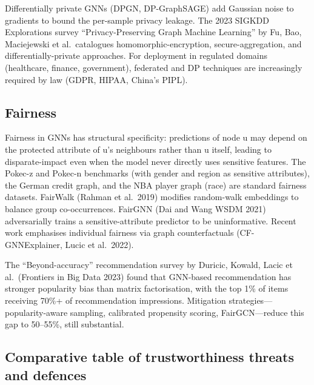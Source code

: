 \documentclass{article}
\begin{document}
Differentially private GNNs (DPGN, DP-GraphSAGE) add Gaussian noise to gradients to bound the per-sample privacy leakage. The 2023 SIGKDD Explorations survey ``Privacy-Preserving Graph Machine Learning'' by Fu, Bao, Maciejewski et al.~catalogues homomorphic-encryption, secure-aggregation, and differentially-private approaches. For deployment in regulated domains (healthcare, finance, government), federated and DP techniques are increasingly required by law (GDPR, HIPAA, China's PIPL).

\subsection{Fairness}\label{fairness}

Fairness in GNNs has structural specificity: predictions of node u may depend on the protected attribute of u's neighbours rather than u itself, leading to disparate-impact even when the model never directly uses sensitive features. The Pokec-z and Pokec-n benchmarks (with gender and region as sensitive attributes), the German credit graph, and the NBA player graph (race) are standard fairness datasets. FairWalk (Rahman et al.~2019) modifies random-walk embeddings to balance group co-occurrences. FairGNN (Dai and Wang WSDM 2021) adversarially trains a sensitive-attribute predictor to be uninformative. Recent work emphasises individual fairness via graph counterfactuals (CF-GNNExplainer, Lucic et al.~2022).

The ``Beyond-accuracy'' recommendation survey by Duricic, Kowald, Lacic et al.~(Frontiers in Big Data 2023) found that GNN-based recommendation has stronger popularity bias than matrix factorisation, with the top 1\% of items receiving 70\%+ of recommendation impressions. Mitigation strategies---popularity-aware sampling, calibrated propensity scoring, FairGCN---reduce this gap to 50--55\%, still substantial.

\subsection{Comparative table of trustworthiness threats and defences}\label{comparative-table-of-trustworthiness-threats-and-defences}
\end{document}
